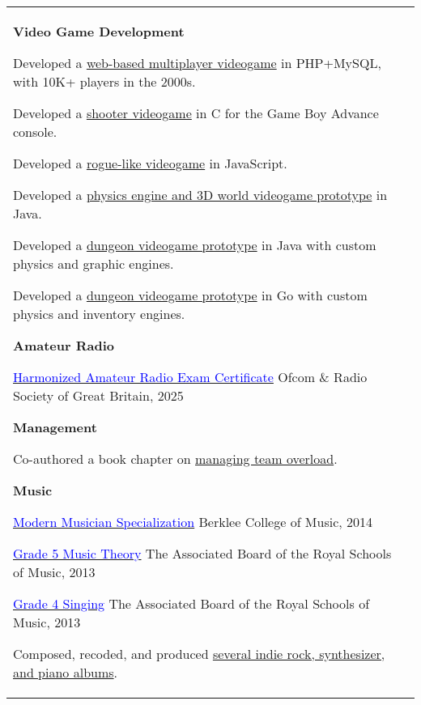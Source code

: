 \documentclass[letterpaper,10pt,oneside]{article}
\newcommand{\DatestampY}[1]{#1}
\newcommand{\itemspacingtwo}{\vspace{0.08cm}}
\newcommand{\sref}[2]{%
    \href{https://0/local/attachments/#1}{\textcolor{blue}{#2}}%
}
\newenvironment{body}
{\par\par
\begin{longtable}{p{0.145\textwidth}p{0.81\textwidth}}}
{\par\end{longtable}\par}
\begin{document}
\begin{body}
\textbf{Video Game Development}
\begin{comp}
\item Developed a \href{https://github.com/lquesada/LifoSource}{web-based multiplayer videogame} in PHP+MySQL, with 10K+ players in the 2000s.
\item Developed a \href{https://github.com/lquesada/SpaceARMy}{shooter videogame} in C for the Game Boy Advance console.
\item Developed a \href{https://cavernal.github.io/cavernal}{rogue-like videogame} in JavaScript.
\item Developed a \href{https://github.com/lquesada/MineWorld}{physics engine and 3D world videogame prototype} in Java.
\item Developed a \href{https://github.com/lquesada/RogueCave}{dungeon videogame prototype} in Java with custom physics and graphic engines.
\item Developed a \href{https://github.com/lquesada/CaveExplorer}{dungeon videogame prototype} in Go with custom physics and inventory engines.
\end{comp}
\itemspacingtwo

\textbf{Amateur Radio}
\begin{comp}
\item \sref{Certificate-HAREC.pdf}{Harmonized Amateur Radio Exam Certificate} \textemdash{ }Ofcom \& Radio Society of Great Britain, \DatestampY{2025}
\end{comp}
\itemspacingtwo

\textbf{Management}
\begin{comp}
\item Co-authored a book chapter on \href{https://landing.google.com/sre/workbook/chapters/overload/}{managing team overload}.
\end{comp}
\itemspacingtwo

\textbf{Music}
\begin{comp}
\item \sref{Diploma-BerkleeCollege-ModernMusician.pdf}{Modern Musician Specialization} \textemdash{ }Berklee College of Music, \DatestampY{2014}
\item \sref{Diploma-ABRSM-MusicTheory5.pdf}{Grade 5 Music Theory} \textemdash{ }The Associated Board of the Royal Schools of Music, \DatestampY{2013}
\item \sref{Diploma-ABRSM-SingingGrade4.pdf}{Grade 4 Singing} \textemdash{ }The Associated Board of the Royal Schools of Music, \DatestampY{2013}
\item Composed, recoded, and produced \href{https://open.spotify.com/artist/3RPEdOJGGdk3kOnmVq3dgX/discography/all}{several indie rock, synthesizer, and piano albums}.
\end{comp}
\end{body}
\end{document}

